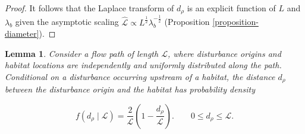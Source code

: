 \documentclass[11pt, class=article, crop=false]{standalone}
\newtheorem{lemma}{Lemma}[subsection]
\theoremstyle{definition}
\begin{document}
\begin{proof}

    It follows that the Laplace transform of $d_{\rho}$ is an explicit function of $L$ and $\lambda_b$ given the asymptotic scaling $\hat{\mathcal{L}} \propto L^{\frac{1}{2}} \lambda_b^{-\frac{1}{2}}$ (Proposition \ref{proposition-diameter}).
    
\end{proof}

\begin{lemma}
\label{lemma-d-rho-dist}
Consider a flow path of length $\mathcal{L}$, where disturbance origins and habitat locations are independently and uniformly distributed along the path. Conditional on a disturbance occurring upstream of a habitat, the distance $d_{\rho}$ between the disturbance origin and the habitat has probability density

\begin{equation}
    f(d_{\rho} \mid \mathcal{L})
    =
    \frac{2}{\mathcal{L}}
    \left(
        1-\frac{d_{\rho}}{\mathcal{L}}
    \right).
    \qquad
    0\leq d_{\rho} \leq \mathcal{L}.
\end{equation}

\end{lemma}
\end{document}

